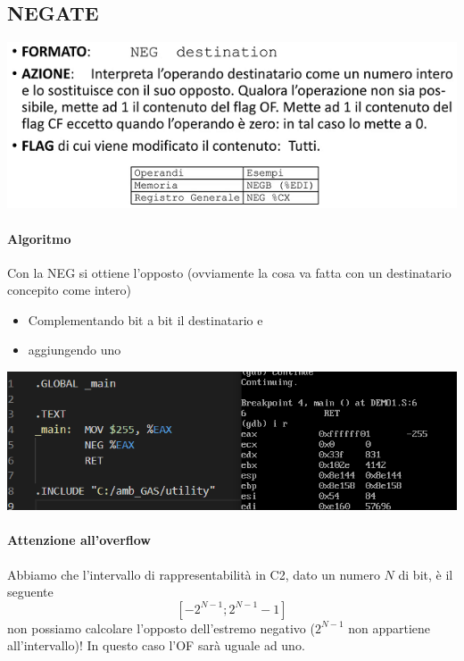\documentclass[11pt]{report}
\begin{document}

\subsection{NEGATE}
\begin{center}
\includegraphics{img/17.PNG}
\end{center}
\paragraph{Algoritmo} Con la NEG si ottiene l'opposto (ovviamente la cosa va fatta con un destinatario concepito come intero) 
\begin{itemize}
\item Complementando bit a bit il destinatario e
\item aggiungendo uno
\end{itemize}
\begin{center}
\includegraphics{img/217.PNG}
\end{center}

\paragraph{Attenzione all'overflow} Abbiamo che l'intervallo di rappresentabilità in C2, dato un numero $N$ di bit, è il seguente
\[\left[-2^{N-1};2^{N-1}-1\right]\]
non possiamo calcolare l'opposto dell'estremo negativo ($2^{N-1}$ non appartiene all'intervallo)! In questo caso l'OF sarà uguale ad uno.
\end{document}
